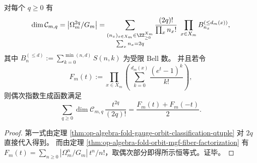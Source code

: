 \begin{corollary}[维数闭式与指数型生成函数]\label{cor:op-algebra-replication-centralizer-dimension-egf}
对每个 \(q\ge 0\) 有
\[
\dim \mathcal C_{m,q}
=\bigl|\Omega_m^{2q}/G_m\bigr|
=
\sum_{\substack{(n_x)_{x\in X_m}\in\ZZ_{\ge 0}^{X_m}\\ \sum_x n_x=2q}}
\frac{(2q)!}{\prod_x n_x!}\;
\prod_{x\in X_m} B_{n_x}^{(\le d_m(x))},
\]
其中 \(B_n^{(\le d)}:=\sum_{k=0}^{\min(n,d)}S(n,k)\) 为受限 Bell 数。
并且若令
\[
F_m(t):=\prod_{x\in X_m}\left(\sum_{k=0}^{d_m(x)}\frac{(e^{t}-1)^k}{k!}\right),
\]
则偶次指数生成函数满足
\[
\sum_{q\ge 0}\dim \mathcal C_{m,q}\,\frac{t^{2q}}{(2q)!}
=\frac{F_m(t)+F_m(-t)}{2}.
\]
\end{corollary}
\begin{proof}
第一式由定理 \ref{thm:op-algebra-fold-gauge-orbit-classification-qtuple} 对 \(2q\) 直接代入得到。
而由定理 \ref{thm:op-algebra-fold-orbit-mgf-fiber-factorization} 有
\(
F_m(t)=\sum_{n\ge 0}|\Omega_m^{n}/G_m|\ t^{n}/n!
\)，取偶次部分即得所示恒等式。证毕。
\end{proof}

\endinput
